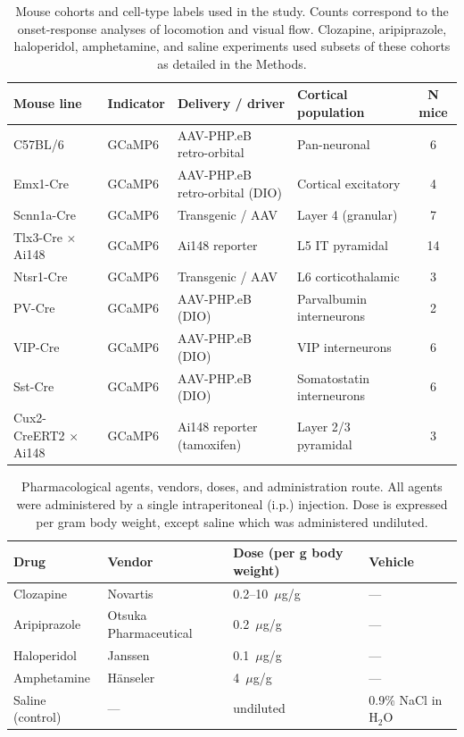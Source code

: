 \documentclass[11pt]{article}
\begin{document}
\begin{table}[htbp]
\centering
\caption{Mouse cohorts and cell-type labels used in the study. Counts correspond to the onset-response analyses of locomotion and visual flow. Clozapine, aripiprazole, haloperidol, amphetamine, and saline experiments used subsets of these cohorts as detailed in the Methods.}
\label{tab:cohorts}
\begin{tabular}{llllc}
\toprule
Mouse line & Indicator & Delivery / driver & Cortical population & N mice \\
\midrule
C57BL/6 & GCaMP6 & AAV-PHP.eB retro-orbital & Pan-neuronal & 6 \\
Emx1-Cre & GCaMP6 & AAV-PHP.eB retro-orbital (DIO) & Cortical excitatory & 4 \\
Scnn1a-Cre & GCaMP6 & Transgenic / AAV & Layer 4 (granular) & 7 \\
Tlx3-Cre $\times$ Ai148 & GCaMP6 & Ai148 reporter & L5 IT pyramidal & 14 \\
Ntsr1-Cre & GCaMP6 & Transgenic / AAV & L6 corticothalamic & 3 \\
PV-Cre & GCaMP6 & AAV-PHP.eB (DIO) & Parvalbumin interneurons & 2 \\
VIP-Cre & GCaMP6 & AAV-PHP.eB (DIO) & VIP interneurons & 6 \\
Sst-Cre & GCaMP6 & AAV-PHP.eB (DIO) & Somatostatin interneurons & 6 \\
Cux2-CreERT2 $\times$ Ai148 & GCaMP6 & Ai148 reporter (tamoxifen) & Layer 2/3 pyramidal & 3 \\
\bottomrule
\end{tabular}
\end{table}

\begin{table}[htbp]
\centering
\caption{Pharmacological agents, vendors, doses, and administration route. All agents were administered by a single intraperitoneal (i.p.) injection. Dose is expressed per gram body weight, except saline which was administered undiluted.}
\label{tab:drugs}
\begin{tabular}{llll}
\toprule
Drug & Vendor & Dose (per g body weight) & Vehicle \\
\midrule
Clozapine & Novartis & 0.2--10~$\mu$g/g & --- \\
Aripiprazole & Otsuka Pharmaceutical & 0.2~$\mu$g/g & --- \\
Haloperidol & Janssen & 0.1~$\mu$g/g & --- \\
Amphetamine & H\"anseler & 4~$\mu$g/g & --- \\
Saline (control) & --- & undiluted & 0.9\% NaCl in H$_2$O \\
\bottomrule
\end{tabular}
\end{table}
\end{document}
